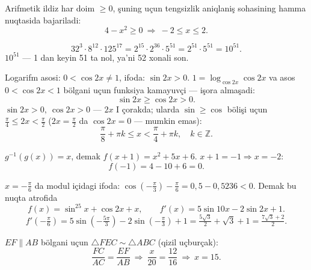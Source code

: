 Arifmetik ildiz har doim $\ge0$, şuning uçun tengsizlik aniqlaniş sohasining hamma nuqtasida bajariladi:
\[4-x^2\ge0\ \Rightarrow\ -2\le x\le2.\]

\[32^3\cdot8^{12}\cdot125^{17}=2^{15}\cdot2^{36}\cdot5^{51}=2^{51}\cdot5^{51}=10^{51}.\]
$10^{51}$ — 1 dan keyin 51 ta nol, ya'ni 52 xonali son.

Logarifm asosi: $0<\cos2x\ne1$, ifoda: $\sin2x>0$. $1=\log_{\cos2x}\cos2x$ va asos $0<\cos2x<1$ bölgani uçun funksiya kamayuvçi — işora almaşadi:
\[\sin2x\ge\cos2x>0.\]
$\sin2x>0,\ \cos2x>0$ — $2x$ I çorakda; ularda $\sin\ge\cos$ bölişi uçun $\frac\pi4\le 2x<\frac\pi2$ ($2x=\frac\pi2$ da $\cos2x=0$ — mumkin emas):
\[\frac\pi8+\pi k\le x<\frac\pi4+\pi k,\quad k\in\mathbb Z.\]

$g^{-1}(g(x))=x$, demak $f(x+1)=x^2+5x+6$. $x+1=-1\Rightarrow x=-2$:
\[f(-1)=4-10+6=0.\]

$x=-\frac\pi6$ da modul içidagi ifoda: $\cos\!\left(-\frac\pi3\right)-\frac\pi6=0{,}5-0{,}5236<0$. Demak bu nuqta atrofida
\[f(x)=\sin^25x+\cos2x+x,\qquad f'(x)=5\sin10x-2\sin2x+1.\]
\[f'\!\left(-\tfrac\pi6\right)=5\sin\!\left(-\tfrac{5\pi}3\right)-2\sin\!\left(-\tfrac\pi3\right)+1=\tfrac{5\sqrt3}2+\sqrt3+1=\tfrac{7\sqrt3+2}2.\]

$EF\parallel AB$ bölgani uçun $\triangle FEC\sim\triangle ABC$ (\textcolor{aux}{qizil} uçburçak):
\[\frac{FC}{AC}=\frac{EF}{AB}\ \Rightarrow\ \frac{x}{20}=\frac{12}{16}\ \Rightarrow\ x=15.\]

